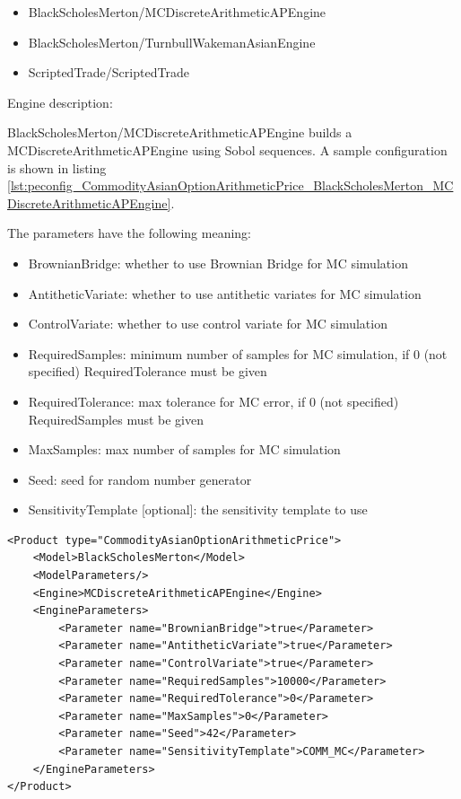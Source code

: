 \begin{itemize}
  \item BlackScholesMerton/MCDiscreteArithmeticAPEngine
  \item BlackScholesMerton/TurnbullWakemanAsianEngine
  \item ScriptedTrade/ScriptedTrade
\end{itemize}

Engine description:

BlackScholesMerton/MCDiscreteArithmeticAPEngine builds a MCDiscreteArithmeticAPEngine using Sobol sequences. A sample
configuration is shown in listing
\ref{lst:peconfig_CommodityAsianOptionArithmeticPrice_BlackScholesMerton_MCDiscreteArithmeticAPEngine}.

The parameters have the following meaning:

\begin{itemize}
\item BrownianBridge: whether to use Brownian Bridge for MC simulation
\item AntitheticVariate: whether to use antithetic variates for MC simulation
\item ControlVariate: whether to use control variate for MC simulation
\item RequiredSamples: minimum number of samples for MC simulation, if 0 (not specified) RequiredTolerance must be given
\item RequiredTolerance: max tolerance for MC error, if 0 (not specified) RequiredSamples must be given
\item MaxSamples: max number of samples for MC simulation
\item Seed: seed for random number generator
\item SensitivityTemplate [optional]: the sensitivity template to use
\end{itemize}

\begin{longlisting}
\begin{verbatim}
<Product type="CommodityAsianOptionArithmeticPrice">
    <Model>BlackScholesMerton</Model>
    <ModelParameters/>
    <Engine>MCDiscreteArithmeticAPEngine</Engine>
    <EngineParameters>
        <Parameter name="BrownianBridge">true</Parameter>
        <Parameter name="AntitheticVariate">true</Parameter>
        <Parameter name="ControlVariate">true</Parameter>
        <Parameter name="RequiredSamples">10000</Parameter>
        <Parameter name="RequiredTolerance">0</Parameter>
        <Parameter name="MaxSamples">0</Parameter>
        <Parameter name="Seed">42</Parameter>
        <Parameter name="SensitivityTemplate">COMM_MC</Parameter>
    </EngineParameters>
</Product>
\end{verbatim}
\caption{Configuration for Product CommodityAsianOptionArithmeticPrice, Model BlackScholesMerton, Engine MCDiscreteArithmeticAPEngine}
\label{lst:peconfig_CommodityAsianOptionArithmeticPrice_BlackScholesMerton_MCDiscreteArithmeticAPEngine}
\end{longlisting}

